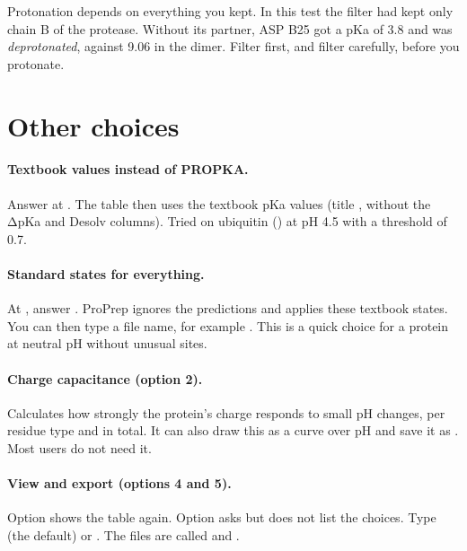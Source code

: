 \begin{example}
Protonation depends on everything you kept. In this test the filter had kept
only chain B of the protease. Without its partner, ASP B25 got a pKa of 3.8 and
was \emph{deprotonated}, against 9.06 in the dimer. Filter first, and filter
carefully, before you protonate.
\end{example}

\section{Other choices}
\label{sec:protonation-other}

\paragraph{Textbook values instead of PROPKA.} Answer  at
. The table then uses the
textbook pKa values (title , without the ΔpKa and Desolv
columns). Tried on ubiquitin () at pH 4.5 with a threshold of 0.7.

\paragraph{Standard states for everything.} At , answer . ProPrep ignores the predictions and
applies these textbook states. You can then type a file name, for example
. This is a quick choice for a protein at neutral pH
without unusual sites.

\paragraph{Charge capacitance (option 2).} Calculates how strongly the
protein's charge responds to small pH changes, per residue type and in total.
It can also draw this as a curve over pH and save it as
. Most users do not need it.

\paragraph{View and export (options 4 and 5).} Option  shows the table
again. Option  asks  but does not
list the choices. Type  (the default) or . The files are
called  and
.

